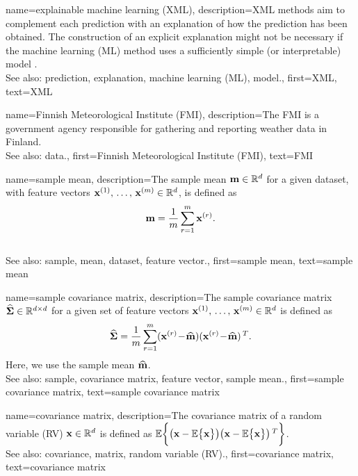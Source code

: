 {
{name={explainable machine learning (XML)}, 
	description={XML 
		methods aim to complement each prediction with an explanation of 
		how the prediction has been obtained. The construction of an explicit explanation 
		might not be necessary if the machine learning (ML) method uses a sufficiently simple (or interpretable) model \cite{rudin2019stop}.
				\\
		See also: prediction, explanation, machine learning (ML), model.},
	first={XML},
	text={XML} 
}

{name={Finnish Meteorological Institute (FMI)}, 
	description={The
		FMI is a government agency responsible for gathering 
		and reporting weather data in Finland.
				\\
		See also: data.},
	first={Finnish Meteorological Institute (FMI)},
	text={FMI} 
}
	
	
{name={sample mean}, 
	description={The sample mean 
		${\bf m} \in \mathbb{R}^{d}$ for a given dataset, with feature vectors 
		${\bf x}^{(1)}, \,\ldots, \,{\bf x}^{(m)} \in \mathbb{R}^{d}$, is defined as 
		$${\bf m} = \frac{1}{m} \sum_{r=1}^{m} {\bf x}^{(r)}.$$ 
					\\
		See also: sample, mean, dataset, feature vector.},
	first={sample mean},
	text={sample mean} 
}

	
{name={sample covariance matrix}, 
	description={The 
		sample covariance matrix $\widehat{\bf \Sigma} \in \mathbb{R}^{d \times d}$ 
		for a given set of feature vectors ${\bf x}^{(1)}, \,\ldots, \,{\bf x}^{(m)} \in \mathbb{R}^{d}$ is defined as 
		$$\widehat{\bf \Sigma} = \frac{1}{m} \sum_{r=1}^{m} ({\bf x}^{(r)}\!-\!\widehat{{\bf m}}) ({\bf x}^{(r)}\!-\!\widehat{{\bf m}})\,^{T}.$$ 
		Here, we use the sample mean $\widehat{{\bf m}}$. 
				\\
		See also: sample, covariance matrix, feature vector, sample mean.},
	first={sample covariance matrix},
	text={sample covariance matrix} 
}

{name={covariance matrix}, 
	description={The covariance matrix of a random variable (RV) ${\bf x} \in \mathbb{R}^{d}$ 
		is defined as $\mathbb{E}  \bigg \{ \big( {\bf x} - \mathbb{E}  \big\{ {\bf x} \big\} \big)  \big({\bf x} - \mathbb{E}  \big\{ {\bf x} \big\} \big)\,^{T} \bigg\}$.
				\\
		See also: covariance, matrix, random variable (RV).},
	first={covariance matrix},
	text={covariance matrix} 
}
	
}
